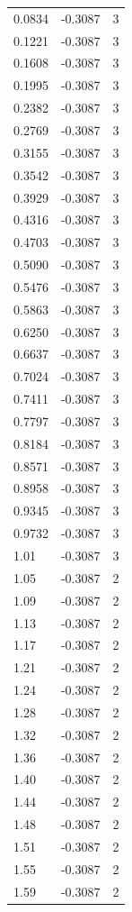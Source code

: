 \begin{longtable}{lrr}
  0.0834 & -0.3087 & 3 \\
  0.1221 & -0.3087 & 3 \\
  0.1608 & -0.3087 & 3 \\
  0.1995 & -0.3087 & 3 \\
  0.2382 & -0.3087 & 3 \\
  0.2769 & -0.3087 & 3 \\
  0.3155 & -0.3087 & 3 \\
  0.3542 & -0.3087 & 3 \\
  0.3929 & -0.3087 & 3 \\
  0.4316 & -0.3087 & 3 \\
  0.4703 & -0.3087 & 3 \\
  0.5090 & -0.3087 & 3 \\
  0.5476 & -0.3087 & 3 \\
  0.5863 & -0.3087 & 3 \\
  0.6250 & -0.3087 & 3 \\
  0.6637 & -0.3087 & 3 \\
  0.7024 & -0.3087 & 3 \\
  0.7411 & -0.3087 & 3 \\
  0.7797 & -0.3087 & 3 \\
  0.8184 & -0.3087 & 3 \\
  0.8571 & -0.3087 & 3 \\
  0.8958 & -0.3087 & 3 \\
  0.9345 & -0.3087 & 3 \\
  0.9732 & -0.3087 & 3 \\
  1.01 & -0.3087 & 3 \\
  1.05 & -0.3087 & 2 \\
  1.09 & -0.3087 & 2 \\
  1.13 & -0.3087 & 2 \\
  1.17 & -0.3087 & 2 \\
  1.21 & -0.3087 & 2 \\
  1.24 & -0.3087 & 2 \\
  1.28 & -0.3087 & 2 \\
  1.32 & -0.3087 & 2 \\
  1.36 & -0.3087 & 2 \\
  1.40 & -0.3087 & 2 \\
  1.44 & -0.3087 & 2 \\
  1.48 & -0.3087 & 2 \\
  1.51 & -0.3087 & 2 \\
  1.55 & -0.3087 & 2 \\
  1.59 & -0.3087 & 2 \\

\end{longtable}

